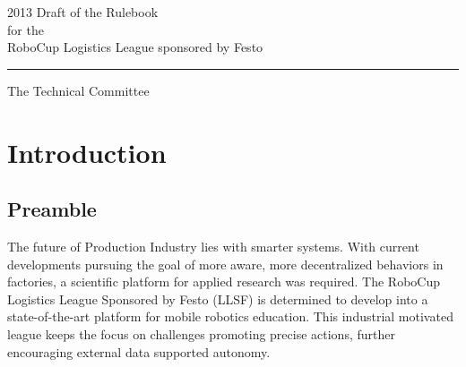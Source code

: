 \documentclass[12pt,twoside]{article}
\begin{document}


\begin{titlepage}
  \vspace*{5cm}
  \begin{center}
    \begin{LARGE}
      2013 Draft of the Rulebook\\[2ex]
      for the\\[2ex]
      RoboCup Logistics League sponsored by Festo\\[4ex]
    \end{LARGE}
    \hrule
    
    \vspace*{4ex}
    \begin{Large}
      The Technical Committee\\[6ex]
    \end{Large}
  \end{center}
  \vspace*{4cm}
  
\end{titlepage}
\thispagestyle{empty}
\pagebreak
\cleardoublepage

\setcounter{page}{1}
\tableofcontents
\newpage
\cleardoublepage

\setcounter{page}{1}

\section{Introduction} \label{sec:intro}

\subsection*{Preamble} \label{sec:preamble}

The future of Production Industry lies with smarter systems.  With
current developments pursuing the goal of more aware, more
decentralized behaviors in factories, a scientific platform for
applied research was required.  The RoboCup Logistics League Sponsored
by Festo (LLSF) is determined to develop into a state-of-the-art
platform for mobile robotics education. This industrial motivated
league keeps the focus on challenges promoting precise actions,
further encouraging external data supported autonomy.
\end{document}
